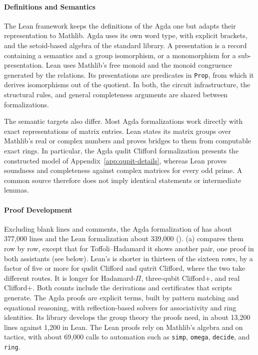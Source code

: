 \documentclass[acmsmall,screen,nonacm]{acmart}
\begin{document}
\paragraph{Definitions and Semantics} The Lean framework keeps the definitions of the Agda one but adapts their representation to Mathlib. Agda uses its own word type, with explicit brackets, and the setoid-based algebra of the standard library. A presentation is a record containing a semantics and a group isomorphism, or a monomorphism for a sub-presentation. Lean uses Mathlib's free monoid and the monoid congruence generated by the relations. Its presentations are predicates in \texttt{Prop}, from which it derives isomorphisms out of the quotient. In both, the circuit infrastructure, the structural rules, and general completeness arguments are shared between formalizations.

The semantic targets also differ. Most Agda formalizations work directly with exact representations of matrix entries. Lean states its matrix groups over Mathlib's real or complex numbers and proves bridges to them from computable exact rings. In particular, the Agda qudit Clifford formalization presents the constructed model of Appendix~\ref{app:qupit-details}, whereas Lean proves soundness and completeness against complex matrices for every odd prime. A common source therefore does not imply identical statements or intermediate lemmas.

\paragraph{Proof Development} Excluding blank lines and comments, the Agda formalization of  has about 377{,}000 lines and the Lean formalization about 339{,}000 (). (a) compares them row by row, except that for Toffoli--Hadamard it shows another pair, one proof in both assistants (see below). Lean's is shorter in thirteen of the sixteen rows, by a factor of five or more for qudit Clifford and qutrit Clifford, where the two take different routes. It is longer for Hadamard-$\Pi$, three-qubit Clifford+\CS, and real Clifford+\CH. Both counts include the derivations and certificates that scripts generate. The Agda proofs are explicit terms, built by pattern matching and equational reasoning, with reflection-based solvers for associativity and ring identities. Its library develops the group theory the proofs need, in about 13{,}200 lines against 1{,}200 in Lean. The Lean proofs rely on Mathlib's algebra and on tactics, with about 69{,}000 calls to automation such as \texttt{simp}, \texttt{omega}, \texttt{decide}, and \texttt{ring}.
\end{document}
